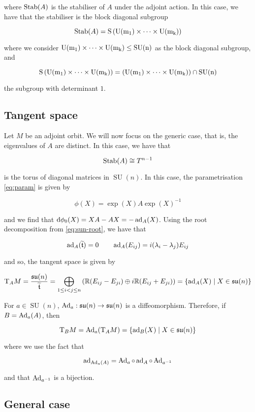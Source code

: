 \documentclass{article}
\DeclareMathOperator{\SU}{SU}
\newcommand{\su}{\mathfrak{su}}
\renewcommand{\tilde}{\widetilde}
\begin{document}
where \(\operatorname{Stab}(A)\) is the stabiliser of \(A\) under the adjoint action. In this case, we have that the stabiliser is the block diagonal subgroup

\[\operatorname{Stab}(A) = \rm S\left(\rm U(m_1) \times \dots \times \rm U(m_k)\right)\]

where we consider \(\rm U(m_1) \times \cdots \times \rm U(m_k) \le \SU(n)\) as the block diagonal subgroup, and

\[\rm S\left(\rm U(m_1) \times \dots \times \rm U(m_k)\right) = \left(\rm U(m_1) \times \cdots \times \rm U(m_k)\right) \cap \SU(n)\]

the subgroup with determinant \(1\).

\subsection{Tangent space}

\label{subsec:tangent}

Let \(M\) be an adjoint orbit. We will now focus on the generic case, that is, the eigenvalues of \(A\) are distinct. In this case, we have that

\[\operatorname{Stab}(A) \cong T^{n-1}\]

is the torus of diagonal matrices in \(\SU(n)\). In this case, the parametrisation \cref{eq:param} is given by

\[\phi(X) = \exp(X)A\exp(X)^{-1}\]

and we find that \(\dd\phi_0(X) = XA - AX = -\operatorname{ad}_A(X)\). Using the root decomposition from \cref{eq:sun-root}, we have that

\[\ad_A(\tilde \mft) = 0 \qquad \ad_A(E_{ij}) = i(\lambda_i - \lambda_j)E_{ij}\]

and so, the tangent space is given by

\[\TT_AM = \frac{\su(n)}{\tilde \mft} = \bigoplus_{1 \le i < j \le n} \left(\R(E_{ij} - E_{ji}) \oplus i\R (E_{ij} + E_{ji})\right) = \{\ad_A(X) \mid X \in \su(n)\}\]

For \(a \in \SU(n)\), \(\Ad_a : \su(n) \to \su(n)\) is a diffeomorphism. Therefore, if \(B = \operatorname{Ad}_a(A)\), then

\[\T_B M = \Ad_a(\T_AM) = \{\ad_B(X) \mid X \in \su(n)\}\]

where we use the fact that

\[\operatorname{ad}_{\operatorname{Ad}_a(A)} = \operatorname{Ad}_a \circ \operatorname{ad}_A \circ \operatorname{Ad}_{a^{-1}}\]

and that \(\operatorname{Ad}_{a^{-1}}\) is a bijection.

\subsection{General case}
\end{document}
